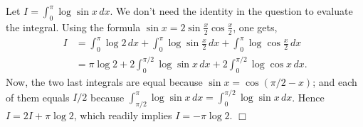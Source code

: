 \documentclass{article}
\begin{document}
Let $I=\int_0^{\pi}\log \sin x\,dx$. We don't need the identity in the
question to evaluate the integral. Using the formula
$\sin x = 2\sin \frac{x}{2}\cos\frac{x}{2}$, one gets, \[\begin{aligned}
I &= \int_0^{\pi}\log 2\,dx + \int_0^{\pi}\log \sin \frac{x}{2}\,dx + \int_0^{\pi}\log \cos \frac{x}{2}\,dx\\
&=\pi \log 2 + 2\int_0^{\pi/2}\log \sin x\,dx + 2\int_0^{\pi/2}\log \cos x\,dx.
\end{aligned}\] Now, the two last integrals are equal because
$\sin x = \cos(\pi/2-x)$; and each of them equals $I/2$ because
$\int_{\pi/2}^{\pi} \log \sin x \,dx = \int_{0}^{\pi/2} \log \sin x \,dx$.
Hence $I =2I + \pi\log 2$, which readily implies $I = -\pi\log 2$.
$\Box$


    
    
    
    
\end{document}
